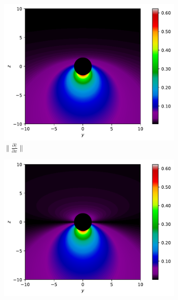 \begin{figure}[H]
	\centering
	\begin{subfigure}{0.32\textwidth}
		\centering
		\includegraphics[width=\textwidth]{images/pdf/Rate_of_change_of_lights_velocity_field_with_respect_to_x.pdf}
		\caption{$\|\frac{\partial \underline{\hat{c}}}{\partial x}\|$}
		\label{fig: Rate of change of lights velocity field subfig_1}
	\end{subfigure}
	\begin{subfigure}{0.32\textwidth}
		\centering
		\includegraphics[width=\textwidth]{images/pdf/Rate_of_change_of_lights_velocity_field_with_respect_to_y.pdf}

\end{subfigure}
\end{figure}
